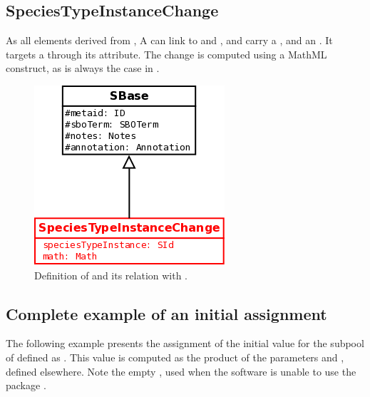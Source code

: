 \subsection{SpeciesTypeInstanceChange}\label{SpeciesTypeInstanceChange}

As all elements derived from , A  can link to  and , and carry a , and an . It targets a  through its  attribute. The change is computed using a MathML construct, as is always the case in \sbmlLthreeVone.

\begin{figure}[H]
\begin{center}
\includegraphics[scale=0.3]{figs/pngs/SpeciesTypeInstanceChangeClass.png} 
\caption{Definition of  and its relation with .}
\label{fig:SpeciesTypeInstanceChangeClass}
\end{center}
\end{figure}

\subsection{Complete example of an initial assignment}

The following example presents the assignment of the initial value for the subpool of  defined as . This value is computed as the product of the parameters  and , defined elsewhere. Note the empty , used when the software is unable to use the package \multiVone.

